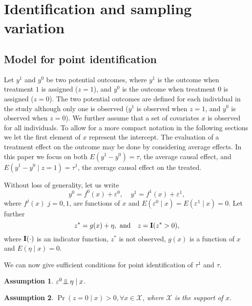 \documentclass[11pt]{article}
\makeatletter
\newenvironment{subtheorem}[1]{%
  \def\subtheoremcounter{#1}%
  \refstepcounter{#1}%
  \protected@edef\theparentnumber{\csname the#1\endcsname}%
  \setcounter{parentnumber}{\value{#1}}%
  \setcounter{#1}{0}%
  \expandafter\def\csname the#1\endcsname{\theparentnumber\:\alph{#1}}%
  \ignorespaces
}{%
  \setcounter{\subtheoremcounter}{\value{parentnumber}}%
  \ignorespacesafterend
}
\newcounter{parentnumber}
\newtheorem{Ass}{Assumption}
\newcommand{\ci}{\mbox{\protect $\: \perp \hspace{-2.3ex}\perp$ }}
\makeatother
\begin{document}
\section{Identification and sampling variation}

\subsection{Model for point identification}

Let $y^1$ and $y^0$ be two potential outcomes, where $y^1$ is the outcome when treatment $1$ is assigned ($z=1$), and $y^0$ is the outcome when treatment $0$ is assigned ($z=0$). The two potential outcomes are defined for each individual in the study although only one is observed ($y^1$ is observed when $z=1$, and $y^0$ is observed when $z=0$).  We further assume that a set of covariates $x$ is observed for all individuals. To allow for a more compact notation in the following sections we let the first element of $x$ represent the intercept. The evaluation of a treatment effect on the outcome may be done by considering average effects. In this paper we focus on both $E(y^1-y^0)=\tau$, the average causal effect, and $E(y^1-y^0\mid z=1)=\tau^1$, the average causal effect on the treated.

Without loss of generality, let us write
\begin{equation}\label{outcome.mod}
	y^0=f^0(x)+\varepsilon^0,\ \ \ \ \ y^1=f^1(x)+\varepsilon^1, 
	\end{equation}
where $f^j(x)$ $j=0,1$, are functions of $x$ and $E(\varepsilon^0\mid x)=E(\varepsilon^1\mid x)=0$. 
Let further
\begin{equation}\label{assignment.mod}
z^*=g(x)+\eta,\ \mbox{and}\ \ \  z={\bf I}(z^*>0),
\end{equation}
where $\bf I(\cdot)$ is an indicator function, $z^*$ is not observed, $g(x)$ is a function of $x$ and $E(\eta\mid x)=0$.

We can now give sufficient conditions for point identification of $\tau^1$ and $\tau$.
\begin{subtheorem}{Ass}
\label{Ass1}
\begin{Ass}
\label{Ass1a}
 $\varepsilon^0\ci \eta\mid x$.
\end{Ass}
\begin{Ass}
\label{Ass1b}
$\Pr(z=0\mid x)>0, \forall x \in \mathcal{X}$, where $\mathcal{X}$ is the support of $x.$
\end{Ass}
\end{subtheorem}
\end{document}
